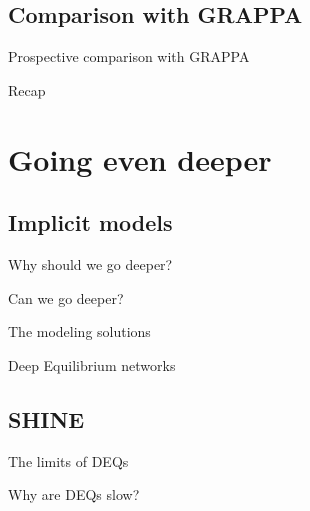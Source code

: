 \documentclass[aspectratio=169,xcolor=dvipsnames]{beamer}
\begin{document}
\subsection{Comparison with GRAPPA}
\begin{frame}{Prospective comparison with GRAPPA}
\end{frame}

\begin{frame}{Recap}
\end{frame}

\section{Going even deeper}
\subsection{Implicit models}

\begin{frame}{Why should we go deeper?}
\end{frame}

\begin{frame}{Can we go deeper?}
\end{frame}

\begin{frame}{The modeling solutions}
\end{frame}

\begin{frame}{Deep Equilibrium networks}
\end{frame}

\subsection{SHINE}
\begin{frame}{The limits of DEQs}
\end{frame}

\begin{frame}{Why are DEQs slow?}
\end{frame}
\end{document}
